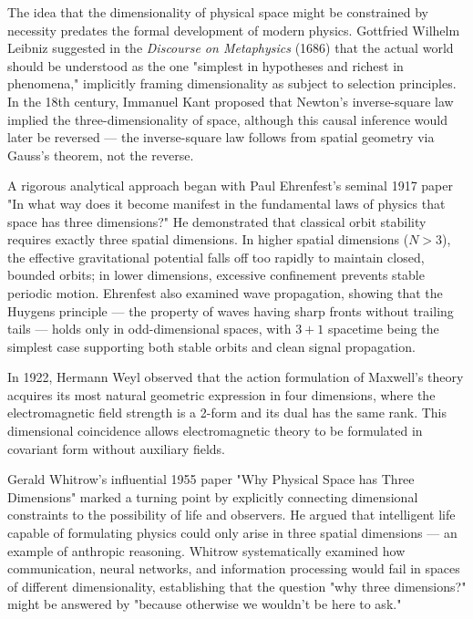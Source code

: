 \begin{historical}
    The idea that the dimensionality of physical space might be constrained by necessity predates the formal development of modern physics. Gottfried Wilhelm Leibniz suggested in the \emph{Discourse on Metaphysics} (1686) that the actual world should be understood as the one "simplest in hypotheses and richest in phenomena," implicitly framing dimensionality as subject to selection principles. In the 18th century, Immanuel Kant proposed that Newton's inverse-square law implied the three-dimensionality of space, although this causal inference would later be reversed — the inverse-square law follows from spatial geometry via Gauss's theorem, not the reverse.
    
    A rigorous analytical approach began with Paul Ehrenfest's seminal 1917 paper "In what way does it become manifest in the fundamental laws of physics that space has three dimensions?" He demonstrated that classical orbit stability requires exactly three spatial dimensions. In higher spatial dimensions ($N > 3$), the effective gravitational potential falls off too rapidly to maintain closed, bounded orbits; in lower dimensions, excessive confinement prevents stable periodic motion. Ehrenfest also examined wave propagation, showing that the Huygens principle — the property of waves having sharp fronts without trailing tails — holds only in odd-dimensional spaces, with $3+1$ spacetime being the simplest case supporting both stable orbits and clean signal propagation.
    
    In 1922, Hermann Weyl observed that the action formulation of Maxwell's theory acquires its most natural geometric expression in four dimensions, where the electromagnetic field strength is a 2-form and its dual has the same rank. This dimensional coincidence allows electromagnetic theory to be formulated in covariant form without auxiliary fields.
    
    Gerald Whitrow's influential 1955 paper "Why Physical Space has Three Dimensions" marked a turning point by explicitly connecting dimensional constraints to the possibility of life and observers. He argued that intelligent life capable of formulating physics could only arise in three spatial dimensions — an example of anthropic reasoning. Whitrow systematically examined how communication, neural networks, and information processing would fail in spaces of different dimensionality, establishing that the question "why three dimensions?" might be answered by "because otherwise we wouldn't be here to ask."
    

\end{historical}
